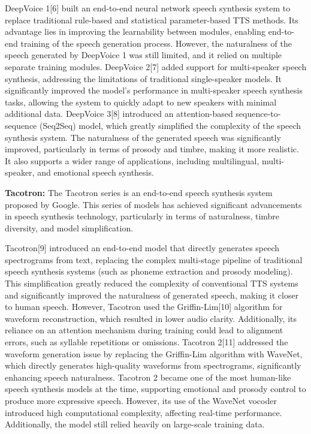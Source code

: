 DeepVoice 1[6] built an end-to-end neural network speech synthesis system to replace traditional rule-based and statistical parameter-based TTS methods. Its advantage lies in improving the learnability between modules, enabling end-to-end training of the speech generation process. However, the naturalness of the speech generated by DeepVoice 1 was still limited, and it relied on multiple separate training modules.
DeepVoice 2[7] added support for multi-speaker speech synthesis, addressing the limitations of traditional single-speaker models. It significantly improved the model’s performance in multi-speaker speech synthesis tasks, allowing the system to quickly adapt to new speakers with minimal additional data.
DeepVoice 3[8] introduced an attention-based sequence-to-sequence (Seq2Seq) model, which greatly simplified the complexity of the speech synthesis system. The naturalness of the generated speech was significantly improved, particularly in terms of prosody and timbre, making it more realistic. It also supports a wider range of applications, including multilingual, multi-speaker, and emotional speech synthesis.

 \textbf{Tacotron:} The Tacotron series is an end-to-end speech synthesis system proposed by Google. This series of models has achieved significant advancements in speech synthesis technology, particularly in terms of naturalness, timbre diversity, and model simplification.

Tacotron[9] introduced an end-to-end model that directly generates speech spectrograms from text, replacing the complex multi-stage pipeline of traditional speech synthesis systems (such as phoneme extraction and prosody modeling). This simplification greatly reduced the complexity of conventional TTS systems and significantly improved the naturalness of generated speech, making it closer to human speech. However, Tacotron used the Griffin-Lim[10] algorithm for waveform reconstruction, which resulted in lower audio clarity. Additionally, its reliance on an attention mechanism during training could lead to alignment errors, such as syllable repetitions or omissions.
Tacotron 2[11] addressed the waveform generation issue by replacing the Griffin-Lim algorithm with WaveNet, which directly generates high-quality waveforms from spectrograms, significantly enhancing speech naturalness. Tacotron 2 became one of the most human-like speech synthesis models at the time, supporting emotional and prosody control to produce more expressive speech. However, its use of the WaveNet vocoder introduced high computational complexity, affecting real-time performance. Additionally, the model still relied heavily on large-scale training data.

